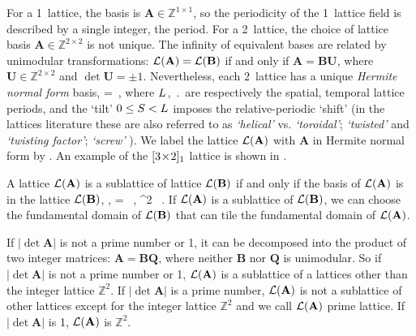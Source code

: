 {For a 1\dmn\ lattice, the basis is $\mathbf{A}\in\mathbb{Z}^{1\times1}$,
so the periodicity of the 1\dmn\ lattice field is described by a single
integer, the period. For a 2\dmn\ lattice, the choice of lattice basis
$\mathbf{A}\in\mathbb{Z}^{2\times2}$  is not unique. The infinity of
equivalent bases are related by unimodular transformations:
$\mathcal{L}(\mathbf{A})=\mathcal{L}(\mathbf{B})$ if and only if
$\mathbf{A}=\mathbf{B}\mathbf{U}$, where
$\mathbf{U}\in\mathbb{Z}^{2\times2}$ and $\det\mathbf{U}=\pm1$.
Nevertheless, each $2$\dmn\ lattice has a unique
\emph{Hermite normal form} basis,
\beq
{} =
\,,
where ${L_{}}$, $\period{}$ are respectively the spatial, temporal
lattice periods, and the `tilt' $0\leq{\ensuremath{S_{}}}<{L_{}}$ imposes the
relative-periodic `shift' {\bcs}
(in the lattices literature these are also
referred to as
\emph{`helical'} vs. \emph{`toroidal'};
\emph{`twisted'} and
\emph{`twisting factor'};
\emph{`screw'}
{\bcs}).
We label the lattice $\mathcal{L}(\mathbf{A})$ with $\mathbf{A}$ in Hermite normal form
 by \LTS{}{}{}. An example of the ${[3\!\times\!2]_{1}}$
lattice is shown in .

A lattice $\mathcal{L}(\mathbf{A})$ is a sublattice of lattice $\mathcal{L}(\mathbf{B})$ if and only if
the basis of $\mathcal{L}(\mathbf{A})$ is in the lattice $\mathcal{L}(\mathbf{B})$, \ie,
\beq
{} =  \, , \quad {} \in {}^{2 } \, .
If $\mathcal{L}(\mathbf{A})$ is a sublattice of $\mathcal{L}(\mathbf{B})$, we can choose the fundamental
domain of $\mathcal{L}(\mathbf{B})$ that can tile the fundamental domain of $\mathcal{L}(\mathbf{A})$.

If $\left| \det \mathbf{A} \right|$ is not a prime number or 1, it can be decomposed into the product of two integer
matrices:
$\mathbf{A} = \mathbf{B} \mathbf{Q}$,
where neither $\mathbf{B}$ nor $\mathbf{Q}$ is unimodular.
So if
$\left| \det \mathbf{A} \right|$ is not a prime number or 1, $\mathcal{L}(\mathbf{A})$ is a sublattice of a
lattices other than the integer lattice $\mathbb{Z}^2$. If $\left| \det \mathbf{A} \right|$ is a prime number,
$\mathcal{L}(\mathbf{A})$ is not a sublattice of other
lattices except for the integer lattice $\mathbb{Z}^2$ and we call $\mathcal{L}(\mathbf{A})$ prime lattice. If $\left| \det \mathbf{A} \right|$ is 1,
$\mathcal{L}(\mathbf{A})$ is $\mathbb{Z}^2$.

}
